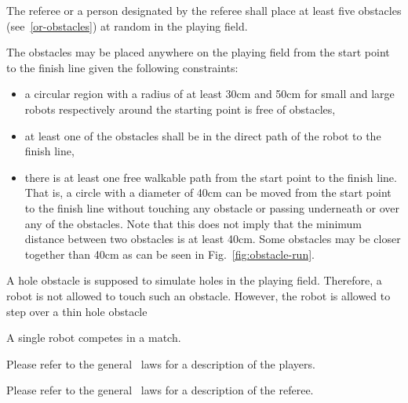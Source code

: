 \documentclass[12pt]{hurocup}
\begin{document}
\begin{lawlist}[OR]
\item The referee or a person designated by the referee shall place
  at least five obstacles (see~\ref{or-obstacles}) at random in the
  playing field.

\item \label{obs-place1} The obstacles may be placed anywhere on the
  playing field from the start point to the finish line given the
  following constraints:

  \begin{itemize} 
  \item a circular region with a radius of at least 30cm and 50cm
    for small and large robots respectively around the starting
    point is free of obstacles,
  \item at least one of the obstacles shall be in the direct path of the
    robot to the finish line,
  \item there is at least one free walkable path from the start point to the
    finish line. That is, a circle with a diameter of 40cm can be moved
    from the start point to the finish line without touching any
    obstacle or passing underneath or over any of the obstacles. Note
    that this does not imply that the minimum distance between two
    obstacles is at least 40cm. Some obstacles may be closer together than
    40cm as can be seen in Fig.~\ref{fig:obstacle-run}. 
  \end{itemize}
\end{lawlist}

\begin{decisions}

\item A hole obstacle is supposed to simulate holes in the playing
  field. Therefore, a robot is not allowed to touch such an
  obstacle. However, the robot is allowed to step over a thin hole
  obstacle

\end{decisions}


\begin{lawlist}[OR]
\item A single robot competes in a match.
\end{lawlist}


Please refer to the general \HuroCup\ laws for a description of
the players.


Please refer to the general \HuroCup\ laws for a description of
the referee.
\end{document}
